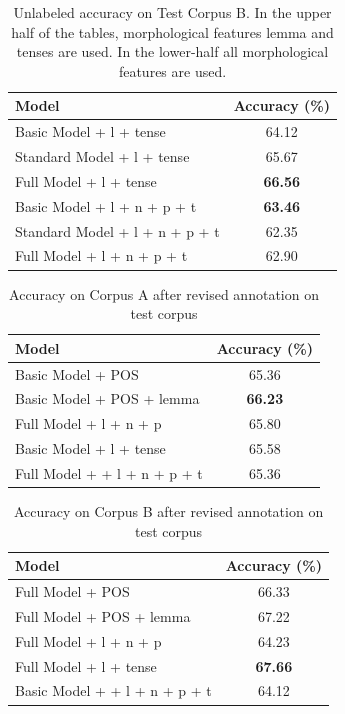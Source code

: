 \documentclass[11pt,letterpaper]{article}
\begin{document}
\begin{table}
\begin{center}
  \begin{tabular}{ l || c }
  \hline
  Model & Accuracy (\%)\\
  \hline
  Basic Model + l + tense& 64.12 \\
  Standard Model + l + tense& 65.67\\
  Full Model + l + tense & \textbf{66.56} \\
  \hline
  Basic Model + l + n + p + t & \textbf{63.46}\\
  Standard Model + l + n + p + t & 62.35\\
  Full Model + l + n + p + t & 62.90\\
  \hline
   \end{tabular}
\end{center}
\caption{Unlabeled accuracy on Test Corpus B. In the upper half of the tables, morphological features lemma and tenses are used. In the lower-half all morphological features are used.}
\label{B_with_tense}
\end{table}
\begin{table}
\begin{center}
  \begin{tabular}{ l || c }
\hline
Model & Accuracy (\%)\\
\hline
Basic Model + POS & 65.36\\
Basic Model + POS + lemma & \textbf{66.23}\\
Full Model + l + n + p  & 65.80\\
Basic Model + l + tense & 65.58\\
Full Model + + l + n + p + t & 65.36\\
\hline
\end{tabular}
\end{center}
\caption{Accuracy on Corpus A after revised annotation on test corpus}
\label{revised_A}
\end{table}
\begin{table}
\begin{center}
  \begin{tabular}{ l || c }
\hline
Model & Accuracy (\%)\\
\hline
Full Model + POS & 66.33\\
Full Model + POS + lemma & 67.22\\
Full Model + l + n + p  & 64.23\\
Full Model + l + tense & \textbf{67.66}\\
Basic Model + + l + n + p + t & 64.12\\
\hline
\end{tabular}
\end{center}
\caption{Accuracy on Corpus B after revised annotation on test corpus}
\label{revised_B}
\end{table}
\end{document}
